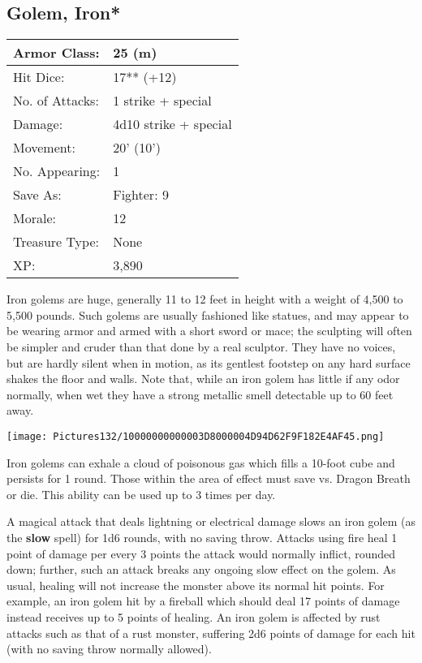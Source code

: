 \documentclass[a4paper,twoside,openany,10pt]{book}
\begin{document}
\begin{multicols}{2}
\subsection*{Golem, Iron*}\label{golem-iron}

\begin{tabularx}{0.48\textwidth}{@{}lX@{}}
Armor Class: & 25 (m) \\\hline
Hit Dice: & 17** (+12) \\\hline
No. of Attacks: & 1 strike + special \\\hline
Damage: & 4d10 strike + special \\\hline
Movement: & 20' (10') \\\hline
No. Appearing: & 1 \\\hline
Save As: & Fighter: 9 \\\hline
Morale: & 12 \\\hline
Treasure Type: & None \\\hline
XP: & 3,890 \\\hline
\end{tabularx}

Iron
golems are huge, generally 11 to 12 feet in height with a weight of 4,500 to 5,500 pounds. Such golems are usually fashioned like statues, and may appear to be wearing armor and armed with a short sword or mace; the sculpting will often be simpler and cruder than that done by a real sculptor. They have no voices, but are hardly silent when in motion, as its gentlest footstep on any hard surface shakes the floor and walls. Note that, while an iron golem has little if any odor normally, when wet they have a strong metallic smell detectable up to 60 feet away.

\begin{center}
	\texttt{[image: Pictures132/10000000000003D8000004D94D62F9F182E4AF45.png]}
\end{center}

Iron golems can exhale a cloud of poisonous gas which fills a 10-foot cube and persists for 1 round. Those within the area of effect must save vs. Dragon Breath or die. This ability can be used up to 3 times per day.


A magical attack that deals lightning or electrical damage slows an iron golem (as the \textbf{slow }spell) for 1d6 rounds, with no saving throw. Attacks using fire heal 1 point of damage per every 3 points the attack would normally inflict, rounded down; further, such an attack breaks any ongoing slow effect on the golem. As usual, healing will not increase the monster above its normal hit points. For example, an iron golem hit by a fireball which should deal 17 points of damage instead receives up to 5 points of healing. An iron golem is affected by rust attacks such as that of a rust monster, suffering 2d6 points of damage for each hit (with no saving throw normally allowed). 


\end{multicols}
\end{document}
